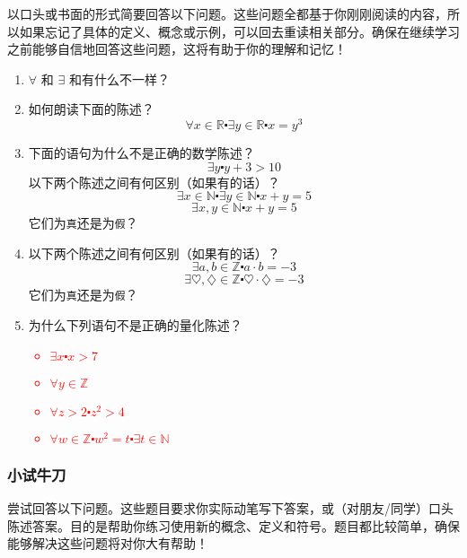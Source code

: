 以口头或书面的形式简要回答以下问题。这些问题全都基于你刚刚阅读的内容，所以如果忘记了具体的定义、概念或示例，可以回去重读相关部分。确保在继续学习之前能够自信地回答这些问题，这将有助于你的理解和记忆！

\begin{enumerate}[label=(\arabic*)]
    \item $\forall$ 和 $\exists$ 和有什么不一样？
    \item 如何朗读下面的陈述？
        \[\forall x \in \mathbb{R} \centerdot \exists y \in \mathbb{R} \centerdot x = y^3\]
    \item 下面的语句为什么不是正确的数学陈述？
        \[\exists y \centerdot y + 3 > 10\]
        以下两个陈述之间有何区别（如果有的话）？
        \[\exists x \in \mathbb{N} \centerdot \exists y \in \mathbb{N} \centerdot x + y = 5\]
        \[\exists x, y \in \mathbb{N} \centerdot x + y = 5\]
        它们为\verb|真|还是为\verb|假|？
    \item 以下两个陈述之间有何区别（如果有的话）？
        \[\exists a, b \in \mathbb{Z} \centerdot a \cdot b = -3\]
        \[\exists \heartsuit, \diamondsuit \in \mathbb{Z} \centerdot \heartsuit \cdot \diamondsuit = -3\]
        它们为\verb|真|还是为\verb|假|？
    \item 为什么下列语句不是正确的量化陈述？
        \textcolor{red}{\begin{itemize}
            \item $\exists x \centerdot x > 7$
            \item $\forall y \in \mathbb{Z}$
            \item $\forall z > 2 \centerdot z^2 > 4$
            \item $\forall w \in \mathbb{Z} \centerdot w^2 = t \centerdot \exists t \in \mathbb{N}$
        \end{itemize}}
\end{enumerate}

\subsubsection*{小试牛刀}

尝试回答以下问题。这些题目要求你实际动笔写下答案，或（对朋友/同学）口头陈述答案。目的是帮助你练习使用新的概念、定义和符号。题目都比较简单，确保能够解决这些问题将对你大有帮助！

